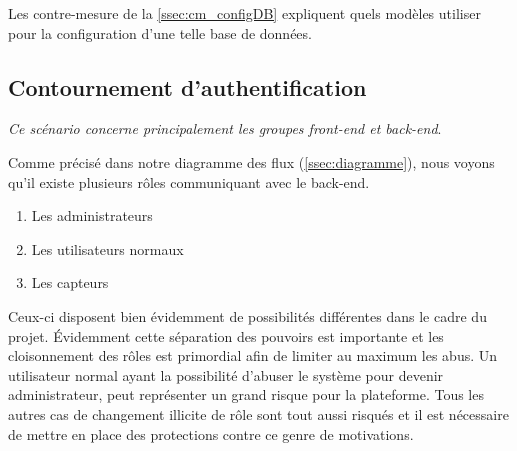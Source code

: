 \documentclass[12pt]{article}
\begin{document}
Les contre-mesure de la \autoref{ssec:cm_configDB} expliquent quels modèles utiliser pour la configuration d'une telle base de données.


\clearpage
\subsection{Contournement d'authentification}

\emph{Ce scénario concerne principalement les groupes front-end et back-end}.
\medskip

Comme précisé dans notre diagramme des flux (\autoref{ssec:diagramme}), nous voyons qu'il existe plusieurs rôles communiquant avec le back-end.

\begin{enumerate}
\item Les administrateurs
\item Les utilisateurs normaux
\item Les capteurs
\end{enumerate}

Ceux-ci disposent bien évidemment de possibilités différentes dans le cadre du projet. Évidemment cette séparation des pouvoirs est importante et les cloisonnement des rôles est primordial afin de limiter au maximum les abus. Un utilisateur normal ayant la possibilité d'abuser le système pour devenir administrateur, peut représenter un grand risque pour la plateforme. Tous les autres cas de changement illicite de rôle sont tout aussi risqués et il est nécessaire de mettre en place des protections contre ce genre de motivations.
\medskip
\end{document}

